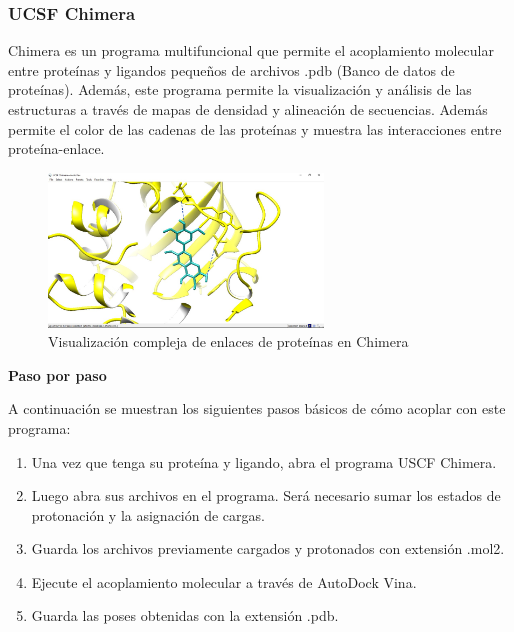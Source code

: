\documentclass[11pt, letterpaper, spanish]{article}
\begin{document}
{{\subsubsection{UCSF Chimera}
\par{Chimera es un programa multifuncional que permite el acoplamiento molecular entre proteínas y ligandos pequeños de archivos .pdb (Banco de datos de proteínas). Además, este programa permite la visualización y análisis de las estructuras a través de mapas de densidad y alineación de secuencias. Además permite el color de las cadenas de las proteínas y muestra las interacciones entre proteína-enlace.}
\begin{figure}
	    \centering
		\caption{Visualización compleja de enlaces de proteínas en Chimera  \cite{Pettersen_2004}}
		\includegraphics[width=0.65\textwidth]{chimera}
	\end{figure}

\par{\textbf{Paso por paso}}
\par{A continuación se muestran los siguientes pasos básicos de cómo acoplar con este programa:}
    \begin{enumerate} [1.]
        \item Una vez que tenga su proteína y ligando, abra el programa USCF Chimera.
        \item{Luego abra sus archivos en el programa. Será necesario sumar los estados de protonación y la asignación de cargas.}
        \item{Guarda los archivos previamente cargados y protonados con extensión .mol2.}
        \item{Ejecute el acoplamiento molecular a través de AutoDock Vina.}
        \item{Guarda las poses obtenidas con la extensión .pdb.}
    \end{enumerate}
}}
\end{document}
